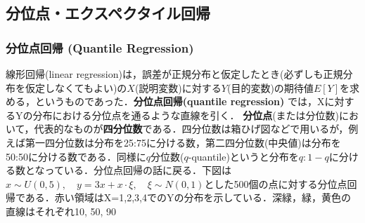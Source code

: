 \subsection{分位点・エクスペクタイル回帰}\subsubsection{分位点回帰 (Quantile Regression)}線形回帰(linear regression)は，誤差が正規分布と仮定したとき(必ずしも正規分布を仮定しなくてもよい)の$X$(説明変数)に対する$Y$(目的変数)の期待値$E[Y]$を求める，というものであった．\textbf{分位点回帰(quantile regression)} では，Xに対するYの分布における分位点を通るような直線を引く．
\textbf{分位点}(または分位数)において，代表的なものが\textbf{四分位数}である．四分位数は箱ひげ図などで用いるが，例えば第一四分位数は分布を25:75に分ける数，第二四分位数(中央値)は分布を50:50に分ける数である．同様に$q$分位数($q$-quantile)というと分布を$q:1-q$に分ける数となっている．分位点回帰の話に戻る．下図は$x\sim U(0, 5),\quad y=3x+x\cdot \xi,\quad \xi\sim N(0,1)$とした500個の点に対する分位点回帰である．赤い領域はX=1,2,3,4でのYの分布を示している．深緑，緑，黄色の直線はそれぞれ10, 50, 90%